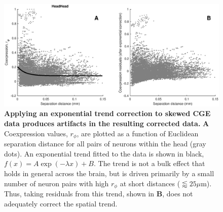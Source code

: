 \documentclass[10pt,letterpaper]{article}
\begin{document}
{%
\begin{figure}[h]
  \centering
    \includegraphics[width=.9\textwidth]{head_rphi_correct.eps}
  \caption{
  \textbf{Applying an exponential trend correction to skewed CGE data produces artifacts in the resulting corrected data.}
  \textbf{A} Coexpression values, $r_\phi$, are plotted as a function of Euclidean separation distance for all pairs of neurons within the head (gray dots).
  An exponential trend fitted to the data is shown in black, $f(x) = A\exp(-\lambda x) + B$.
    The trend is not a bulk effect that holds in general across the brain, but is driven primarily by a small number of neuron pairs with high $r_\phi$ at short distances ($\lessapprox 25\mu$m).
    Thus, taking residuals from this trend, shown in \textbf{B}, does not adequately correct the spatial trend.
    }
  \label{fig:S_head_rphi_correct}
\end{figure}







}
\end{document}
